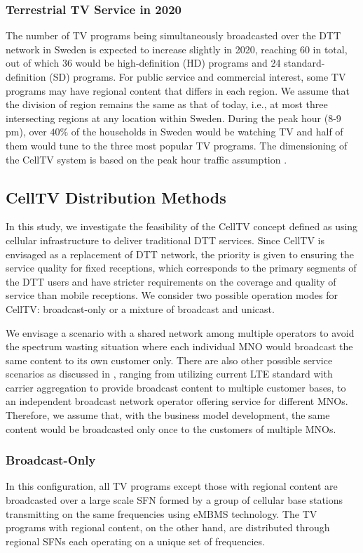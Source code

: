 \documentclass[journal]{IEEEtran}
\begin{document}
\subsubsection{\textbf{Terrestrial TV Service in 2020}}

The number of TV programs being simultaneously broadcasted over the DTT network in Sweden is expected to increase slightly in 2020, reaching 60 in total, out of which 36 would be high-definition (HD) programs and 24 standard-definition (SD) programs. For public service and commercial interest, some TV programs may have regional content that differs in each region. We assume that the division of region remains the same as that of today, i.e., at most three intersecting regions at any location within Sweden. During the peak hour (8-9 pm), over $40\%$ of the households in Sweden would be watching TV and half of them would tune to the three most popular TV programs. The dimensioning of the CellTV system is based on the peak hour traffic assumption \cite{PTS1}.

\subsection{CellTV Distribution Methods}
In this study, we investigate the feasibility of the CellTV concept defined as using cellular infrastructure to deliver traditional DTT services. Since CellTV is envisaged as a replacement of DTT network, the priority is given to ensuring the service quality for fixed receptions, which corresponds to the primary segments of the DTT users and have stricter requirements on the coverage and quality of service than mobile receptions. We consider two possible operation modes for CellTV: broadcast-only or a mixture of broadcast and unicast.

We envisage a scenario with a shared network among multiple operators to avoid the spectrum wasting situation where each individual MNO would broadcast the same content to its own customer only. There are also other possible service scenarios as discussed in \cite{qualcomm}, ranging from utilizing current LTE standard with carrier aggregation to provide broadcast content to multiple customer bases, to an independent broadcast network operator offering service for different MNOs. Therefore, we assume that, with the business model development, the same content would be broadcasted only once to the customers of multiple MNOs.

\subsubsection{\textbf{Broadcast-Only}}
In this configuration, all TV programs except those with regional content are broadcasted over a large scale SFN formed by a group of cellular base stations transmitting on the same frequencies using eMBMS technology. The TV programs with regional content, on the other hand, are distributed through regional SFNs each operating on a unique set of frequencies.
\end{document}
